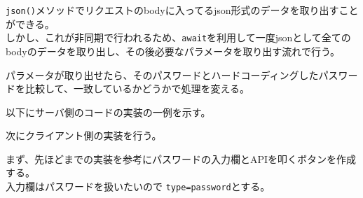 \begin{Shaded}
\begin{Highlighting}[]
    \OperatorTok{=} \NormalTok{()}\OperatorTok{;}
    \OperatorTok{=}
\end{Highlighting}
\end{Shaded}

\texttt{json()}メソッドでリクエストのbodyに入ってるjson形式のデータを取り出すことができる。\\
しかし、これが非同期で行われるため、\texttt{await}を利用して一度jsonとして全てのbodyのデータを取り出し、その後必要なパラメータを取り出す流れで行う。

パラメータが取り出せたら、そのパスワードとハードコーディングしたパスワードを比較して、一致しているかどうかで処理を変える。

以下にサーバ側のコードの実装の一例を示す。

\begin{Shaded}
\begin{Highlighting}[]
   \OperatorTok{===}  \OperatorTok{\&\&}\OperatorTok{===} \NormalTok{ )\{}
    \OperatorTok{=} \NormalTok{()}\OperatorTok{;}
    \OperatorTok{=}
    \OperatorTok{===} \NormalTok{ )\{}
        \NormalTok{(}\NormalTok{)}
\NormalTok{    \}}\NormalTok{\{}
        \NormalTok{(}\NormalTok{)}
\NormalTok{    \}}
\NormalTok{  \}}
\end{Highlighting}
\end{Shaded}

次にクライアント側の実装を行う。

まず、先ほどまでの実装を参考にパスワードの入力欄とAPIを叩くボタンを作成する。\\
入力欄はパスワードを扱いたいので \texttt{type=password}とする。

